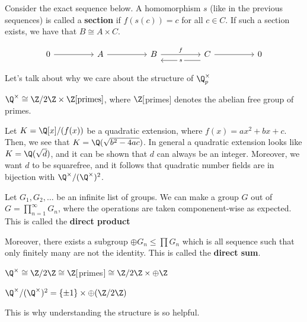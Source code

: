 \begin{defn}
    Consider the exact sequence below. A homomorphism $s$ (like in the previous sequences) is called a \textbf{section} if $f(s(c))=c$ for all $c \in C$. If such a section exists, we have that $B \cong A \times C$.
\end{defn}

\[\begin{tikzcd}
	0 && A && B && C && 0
	\arrow[from=1-1, to=1-3]
	\arrow[from=1-3, to=1-5]
	\arrow["f", from=1-5, to=1-7]
	\arrow["s"{description}, shift left=3, from=1-7, to=1-5]
	\arrow[from=1-7, to=1-9]
\end{tikzcd}\]

Let's talk about why we care about the structure of $\Q_p^\times$

\begin{notebox*}[Recall]
    $\Q^\times \cong \Z/2\Z \times \Z[\text{primes}]$, where $\Z[$primes$]$ denotes the abelian free group of primes.
\end{notebox*}

Let $K = \Q[x]/(f(x))$ be a quadratic extension, where $f(x)=ax^2+bx+c$. Then, we see that $K = \Q(\sqrt{b^2-4ac})$. In general a quadratic extension looks like $K=\Q(\sqrt d)$, and it can be shown that $d$ can always be an integer. Moreover, we want $d$ to be squarefree, and it follows that quadratic number fields are in bijection with $\Q^\times /(\Q^\times)^2$.

\begin{defn}
    Let $G_1,G_2,\dots$ be an infinite list of groups. We can make a group $G$ out of $G=\prod_{n=1}^\infty G_n$, where the operations are taken componenent-wise as expected. This is called the \textbf{direct product}

    Moreover, there exists a subgroup $\oplus G_n \leq \prod G_n$ which is all sequence such that only finitely many are not the identity. This is called the \textbf{direct sum}.
\end{defn}

\begin{rmk}
    $\Q^\times \cong \Z/2\Z \cong \Z[$primes$] \cong \Z/2\Z \times \oplus \Z$
\end{rmk}

\begin{cor}
    $\Q^\times /(\Q^\times)^2 = \{ \pm 1\} \times \oplus (\Z/2\Z)$
\end{cor}
This is why understanding the structure is so helpful.


